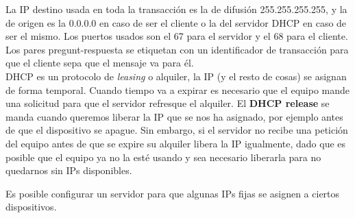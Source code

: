 La IP destino usada en toda la transacción es la de difusión 255.255.255.255, y la de origen es la 0.0.0.0 en caso de ser el cliente o la del servidor DHCP en caso de ser el mismo. Los puertos usados son el 67 para el servidor y el 68 para el cliente.\\

Los pares pregunt-respuesta se etiquetan con un identificador de transacción para que el cliente sepa que el mensaje va para él.\\

DHCP es un protocolo de \textit{leasing} o alquiler, la IP (y el resto de cosas) se asignan de forma temporal. Cuando tiempo va a expirar es necesario que el equipo mande una solicitud para que el servidor refresque el alquiler. El \textbf{DHCP release} se manda cuando queremos liberar la IP que se nos ha asignado, por ejemplo antes de que el dispositivo se apague. Sin embargo, si el servidor no recibe una petición del equipo antes de que se expire su alquiler libera la IP igualmente, dado que es posible que el equipo ya no la esté usando y sea necesario liberarla para no quedarnos sin IPs disponibles. 

\begin{observacion}
    Es posible configurar un servidor para que algunas IPs fijas se asignen a ciertos dispositivos.
\end{observacion}


